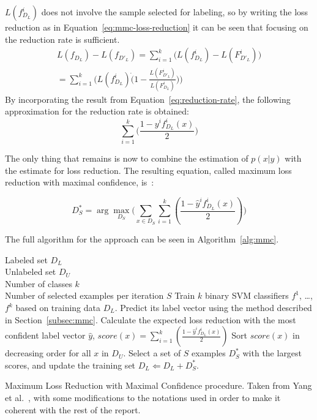 $L(f^i_{D_L})$ does not involve the sample selected for labeling, so by writing the loss reduction as in Equation~\ref{eq:mmc-loss-reduction} it can be seen that focusing on the reduction rate is sufficient.
\begin{equation}\label{eq:mmc-loss-reduction}
    \begin{split}
        L(f_{D_L}) - L(f_{D'_L}) = \sum_{i=1}^k\big ( L(f^i_{D_L}) - L(F^i_{D'_L}) \big )\\
        = \sum_{i=1}^k\big ( L(f^i_{D_L}) \dot (1 - \frac{L(F^i_{D'_L})}{L(F^i_{D_L})}) \big )
    \end{split}
\end{equation}
By incorporating the result from Equation~\ref{eq:reduction-rate}, the following approximation for the reduction rate is obtained:
\begin{equation}
    \sum_{i=1}^k\big ( \frac{1 - y^if^i_{D_L}(x)}{2} \big )
\end{equation}

The only thing that remains is now to combine the estimation of $p(x|y)$ with the estimate for loss reduction.
The resulting equation, called maximum loss reduction with maximal confidence, is~\cite{yang2009effective}:

\begin{equation}
    D^*_S = \arg \max_{D_S} \big ( \sum_{x \in D_S} \sum_{i=1}^k (\frac{1 - \hat{y}^if^i_{D_L}(x)}{2}) \big )
\end{equation}

The full algorithm for the approach can be seen in Algorithm~\ref{alg:mmc}.

\begin{algorithm}
    \begin{algorithmic}
        \REQUIRE Labeled set $D_L$\\
                 Unlabeled set $D_U$ \\
                 Number of classes $k$ \\
                 Number of selected examples per iteration $S$
        \REPEAT
            \STATE Train $k$ binary SVM classifiers $f^1$, \dots, $f^k$ based on training data $D_L$.
                \STATE Predict its label vector using the method described in Section~\ref{subsec:mmc}.
                \STATE Calculate the expected loss reduction with the most confident label vector $\hat{y}$, $score(x) = \sum_{i=1}^k (\frac{1 - \hat{y}^if^i_{D_L}(x)}{2})$
            \ENDFOR
            \STATE Sort $score(x)$ in decreasing order for all $x$ in $D_U$.
            \STATE Select a set of $S$ examples $D_S^*$ with the largest scores, and update the training set $D_L \Leftarrow D_L + D^*_S$.
    \end{algorithmic}

    \caption{Maximum Loss Reduction with Maximal Confidence procedure. Taken from Yang et al\@.~\cite{yang2009effective}, with some modifications to the notations used in order to make it coherent with the rest of the report.}
    \label{alg:mmc}
\end{algorithm}


